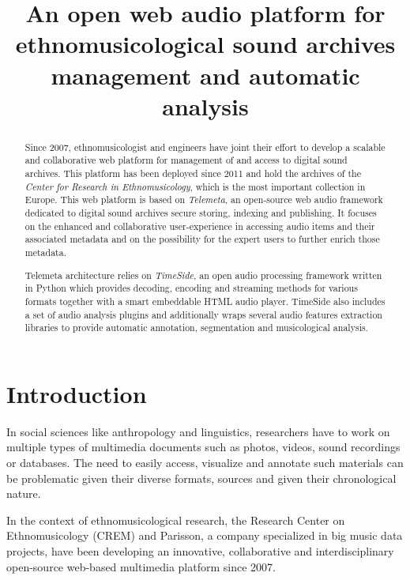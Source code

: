 \documentclass{paper}
\title{An open web audio platform for ethnomusicological sound archives management and automatic analysis}
\begin{document}
%
\maketitle
%
\begin{abstract}
Since 2007, ethnomusicologist and engineers have joint their effort to develop a scalable and collaborative web platform for management of and access to digital sound archives. This platform has been deployed since 2011 and hold the archives of the \emph{Center for Research in Ethnomusicology}, which is the most important collection in Europe.
This web platform is based on \emph{Telemeta}, an open-source web audio framework dedicated to digital sound archives secure storing, indexing and publishing. It focuses on the enhanced and collaborative user-experience in accessing audio items and their associated metadata and on the possibility for the expert users to further enrich those metadata.

 Telemeta architecture relies on \emph{TimeSide}, an open audio processing framework written in Python which provides decoding,  encoding and streaming methods for various formats together with a smart embeddable HTML audio player. TimeSide also includes a set of audio analysis plugins and additionally wraps several audio features extraction libraries to provide automatic annotation, segmentation and musicological analysis.

\end{abstract}

\section{Introduction}\label{sec:intro}

 In social sciences like anthropology and linguistics, researchers have to work on multiple types of multimedia documents such as photos, videos, sound recordings or databases. The need to easily access, visualize and annotate such materials can be problematic given their diverse formats, sources and given their chronological nature.

 In the context of ethnomusicological research, the Research Center on Ethnomusicology (CREM) and Parisson, a company specialized in big music data projects, have been developing an innovative, collaborative and interdisciplinary open-source web-based multimedia platform since 2007. 
\end{document}
